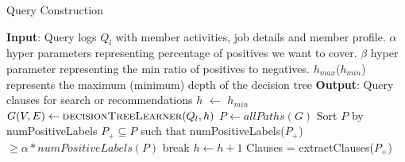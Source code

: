 \begin{algorithm}
\caption{Query Construction}\label{alg:query-construction}
\begin{algorithmic}[1]

    \State \textbf{Input}: Query logs $Q_l$ with member activities, job details
    and member profile. $\alpha$ hyper parameters representing
    percentage of positives we want to cover. $\beta$ hyper parameter
    representing the min ratio of positives to negatives. $h_{max}$($h_{min}$) represents
    the maximum (minimum) depth of the decision tree  
    \State \textbf{Output}: Query clauses for search or recommendations
        \State $h$ $\gets$ $h_{min}$
            \State $G(V,E) \gets \Call{decisionTreeLearner}{Q_l, h}$
            \State $P \gets allPaths(G)$
            \State Sort $P$ by numPositiveLabels
            \State $P_{+} \subseteq P$ such that numPositiveLabels($P_+$) $\geq \alpha * numPositiveLabels(P)$
            \State 
                \State break     
            \EndIf
            $h \gets h + 1$
            \State 
        \EndWhile
        Clauses = extractClauses($P_+$)

    \EndFunction

\end{algorithmic}
\end{algorithm}

